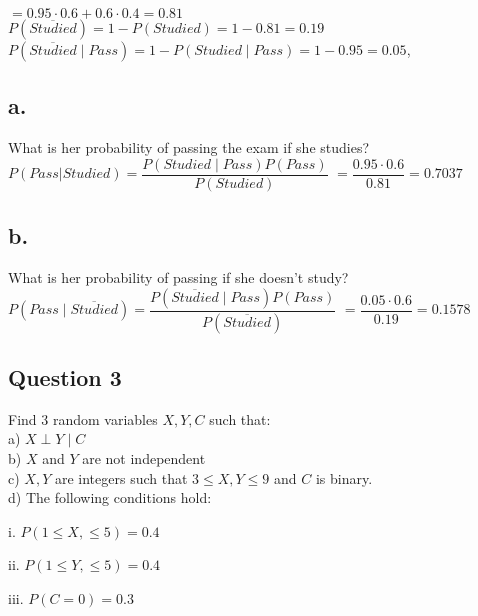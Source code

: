 \documentclass[12pt]{article}
\newcommand\tab[1][1cm]{\hspace*{#1}}
\begin{document}
$= 0.95 \cdot 0.6 + 0.6 \cdot 0.4= 0.81$ \\

$P(\overline{Studied}) = 1 - P(Studied) = 1 - 0.81 = 0.19 $\\

$P(\overline{Studied} \mid Pass) = 1 - P(Studied \mid Pass) = 1 - 0.95 = 0.05$,


\subsection*{a.}
What is her probability of passing the exam if she studies?\\

$P(Pass| Studied) = \dfrac{P(Studied \mid Pass)P(Pass)}{P(Studied)}$ 
$ =  \dfrac{0.95 \cdot 0.6}{0.81} = 0.7037 $

\subsection*{b.}

What is her probability of passing if she doesn't study? \\

$P(Pass \mid \overline{Studied}) = \dfrac{P(\overline{Studied} \mid Pass)P(Pass)}{P(\overline{Studied})}$
$ =  \dfrac{0.05 \cdot 0.6}{0.19} = 0.1578 $

\newpage

\begin{center}
\section*{Question 3}
\end{center}
Find 3 random variables $X, Y, C$ such that:\\


a) $X \perp Y \mid C $\\

b) $X$ and $Y$ are not independent \\

c) $X, Y$ are integers such that $3 \leq X, Y \leq 9$ and $C$ is binary.\\

d) The following conditions hold:

\tab i.  $ P(1 \leq X, \leq 5) = 0.4$

\tab ii.  $ P(1 \leq Y, \leq 5) = 0.4$

\tab iii.  $ P(C=0) = 0.3$\\
\end{document}

